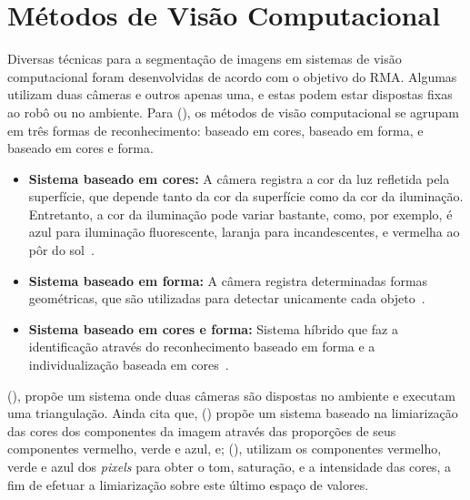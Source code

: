 \section{Métodos de Visão Computacional}
\label{sec:metodos-visaoComputacional}

Diversas técnicas para a segmentação de imagens em sistemas de visão computacional foram desenvolvidas de acordo com o objetivo do RMA. Algumas utilizam duas câmeras e outros apenas uma, e estas podem estar dispostas fixas ao robô ou no ambiente. Para \citeauthor{araujo2008reconhecimento} (\citeyear{araujo2008reconhecimento}), os métodos de visão computacional se agrupam em três formas de reconhecimento: baseado em cores, baseado em forma, e baseado em cores e forma.

\begin{itemize}
    \item \textbf{Sistema baseado em cores:} A câmera registra a cor da luz refletida pela superfície, que depende tanto da cor da superfície como da cor da iluminação. Entretanto, a cor da iluminação pode variar bastante, como, por exemplo, é azul para iluminação fluorescente, laranja para incandescentes, e vermelha ao pôr do sol~\cite{konzen2007problema}.
    
    \item \textbf{Sistema baseado em forma:} A câmera registra determinadas formas geométricas, que são utilizadas para detectar unicamente cada objeto~\cite{garcia2007arcaboucco}.
    
    \item \textbf{Sistema baseado em cores e forma:} Sistema híbrido que faz a identificação através do reconhecimento baseado em forma e a individualização baseada em cores~\cite{martins2007towards}.
\end{itemize}


\citeauthor{andrade2006sistema} (\citeyear{andrade2006sistema}), propõe um sistema onde duas câmeras são dispostas no ambiente e executam uma triangulação. Ainda cita que, \citeauthor{souza2003desenvolvimento} (\citeyear{souza2003desenvolvimento}) propõe um sistema baseado na limiarização das cores dos componentes da imagem através das proporções de seus componentes vermelho, verde e azul, e; \citeauthor{penharbel2004filtro} (\citeyear{penharbel2004filtro}), utilizam os componentes vermelho, verde e azul dos \textit{pixels} para obter o tom, saturação, e a intensidade das cores, a fim de efetuar a limiarização sobre este último espaço de valores.

